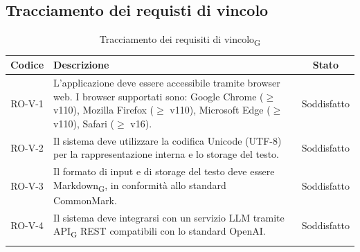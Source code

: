 \documentclass[11pt,a4paper]{article}
\newcommand{\gls}[1]{#1\textsubscript{G}}
\begin{document}
\subsection{Tracciamento dei requisti di vincolo}
\begin{longtable}{|c|p{11cm}|c|}
\hline
\textbf{Codice} & \textbf{Descrizione} & \textbf{Stato}\\
\hline
\endhead
RO-V-1 & L'applicazione deve essere accessibile tramite browser web. 
I browser supportati sono: Google Chrome ($\geq$ v110), Mozilla Firefox 
($\geq$ v110), Microsoft Edge ($\geq$ v110), Safari ($\geq$ v16). & Soddisfatto \\
\hline
RO-V-2 & Il sistema deve utilizzare la codifica Unicode (UTF-8) per la rappresentazione interna e lo storage del testo. & Soddisfatto \\
\hline
RO-V-3 & Il formato di input e di storage del testo deve essere \gls{Markdown}, in conformità allo standard CommonMark. & Soddisfatto\\
\hline
RO-V-4 & Il sistema deve integrarsi con un servizio LLM tramite \gls{API} REST compatibili con lo standard OpenAI. & Soddisfatto \\
\hline
\addlinespace[1em]
\caption{Tracciamento dei \gls{requisiti di vincolo}}
\label{tab:tracciamento_requisiti_vincolo}
\end{longtable}
\end{document}
